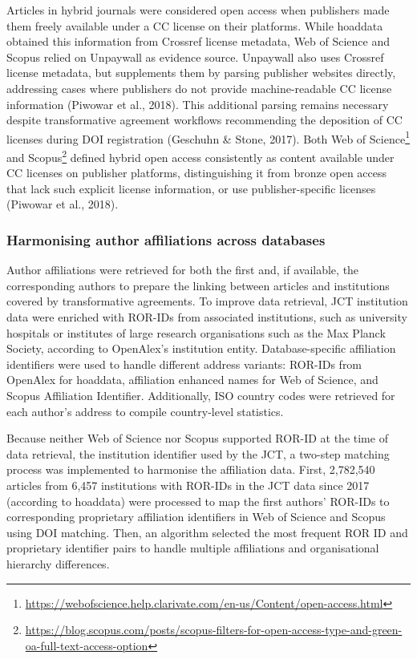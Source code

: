 \documentclass[a4paper,man,floatsintext,longtable,noextraspace,10pt]{apa6}
\begin{document}
Articles in hybrid journals were considered open access when publishers
made them freely available under a CC license on their platforms. While
hoaddata obtained this information from Crossref license metadata, Web
of Science and Scopus relied on Unpaywall as evidence source. Unpaywall
also uses Crossref license metadata, but supplements them by parsing
publisher websites directly, addressing cases where publishers do not
provide machine-readable CC license information (Piwowar et al., 2018).
This additional parsing remains necessary despite transformative
agreement workflows recommending the deposition of CC licenses during
DOI registration (Geschuhn \& Stone, 2017). Both Web of
Science\footnote{\url{https://webofscience.help.clarivate.com/en-us/Content/open-access.html}}
and Scopus\footnote{\url{https://blog.scopus.com/posts/scopus-filters-for-open-access-type-and-green-oa-full-text-access-option}}
defined hybrid open access consistently as content available under CC
licenses on publisher platforms, distinguishing it from bronze open
access that lack such explicit license information, or use
publisher-specific licenses (Piwowar et al., 2018).

\subsubsection{Harmonising author affiliations across
databases}\label{harmonising-author-affiliations-across-databases}

Author affiliations were retrieved for both the first and, if available,
the corresponding authors to prepare the linking between articles and
institutions covered by transformative agreements. To improve data
retrieval, JCT institution data were enriched with ROR-IDs from
associated institutions, such as university hospitals or institutes of
large research organisations such as the Max Planck Society, according
to OpenAlex's institution entity. Database-specific affiliation
identifiers were used to handle different address variants: ROR-IDs from
OpenAlex for hoaddata, affiliation enhanced names for Web of Science,
and Scopus Affiliation Identifier. Additionally, ISO country codes were
retrieved for each author's address to compile country-level statistics.

Because neither Web of Science nor Scopus supported ROR-ID at the time
of data retrieval, the institution identifier used by the JCT, a
two-step matching process was implemented to harmonise the affiliation
data. First, 2,782,540 articles from 6,457 institutions with ROR-IDs in
the JCT data since 2017 (according to hoaddata) were processed to map
the first authors' ROR-IDs to corresponding proprietary affiliation
identifiers in Web of Science and Scopus using DOI matching. Then, an
algorithm selected the most frequent ROR ID and proprietary identifier
pairs to handle multiple affiliations and organisational hierarchy
differences.
\end{document}
